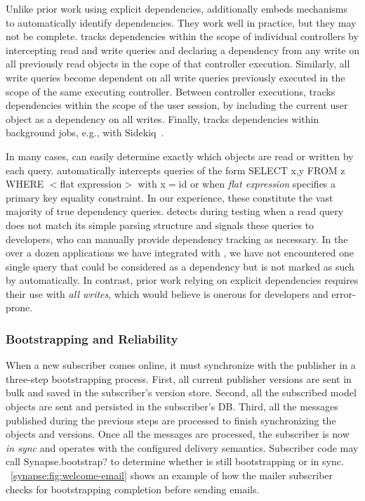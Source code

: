 Unlike prior work using explicit dependencies, \synapse additionally embeds
mechanisms to automatically identify dependencies.  They work well in
practice, but they may not be complete.  \synapse tracks dependencies
within the scope of individual controllers by intercepting read and write
queries and declaring a dependency from any write on all previously read objects
in the cope of that controller execution.  Similarly, all write queries
become dependent on all write queries previously executed in the scope of the
same executing controller. Between controller executions, \synapse tracks
dependencies within the scope of the user session, by including the current user
object as a dependency on all writes.  Finally, \synapse tracks dependencies
within background jobs, e.g., with Sidekiq~\cite{sidekiq}.

In many cases, \synapse can easily determine exactly which objects are read
or written by each query. \synapse automatically intercepts queries of the
form { \code SELECT x,y FROM z WHERE $<$flat expression$>$} with {\code x$=$id}
or when {\em flat expression} specifies a primary key equality constraint.
In our experience, these constitute the vast majority of true dependency
queries.  \synapse detects during testing when a read query does not match its
simple parsing structure and signals these queries to developers, who can
manually provide dependency tracking as necessary.  In the over a dozen
applications we have integrated with \synapse, we have not encountered one
single query that could be considered as a dependency but is not marked as such
by \synapse automatically.  In contrast, prior work relying on explicit
dependencies requires their use with {\em all writes}, which would believe is
onerous for developers and error-prone.

\subsubsection{Bootstrapping and Reliability} \label{synapse:sec:arch:bootstrapping}

When a new subscriber comes online, it must synchronize with the publisher in a
three-step bootstrapping process. First, all current publisher versions are sent
in bulk and saved in the subscriber's version store. Second, all the subscribed model
objects are sent and persisted in the subscriber's DB. Third, all the messages
published during the previous steps are processed to finish synchronizing the
objects and versions. Once all the messages are processed, the subscriber is now
{\em in sync} and operates with the configured delivery semantics.
Subscriber code may call {\code Synapse.bootstrap?} to determine whether \synapse
is still bootstrapping or in sync. \F~\ref{synapse:fig:welcome-email} shows an example of
how the mailer subscriber checks for bootstrapping completion before sending emails.

